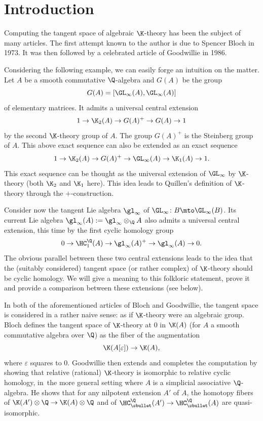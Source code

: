 \section*{Introduction}

Computing the tangent space of algebraic $\K$-theory has been the subject of many articles. The first attempt known to the author is due to Spencer Bloch \cite{bloch:tangentk} in 1973. It was then followed by a celebrated article of Goodwillie \cite{goodwillie:tangentk} in 1986.

Considering the following example, we can easily forge an intuition on the matter. Let $A$ be a smooth commutative $\Q$-algebra and $G(A)$ be the group
\[
G(A) = [\GL_\infty(A),\GL_\infty(A)]
\]
of elementary matrices. It admits a universal central extension
\[
1 \to \K_2(A) \to G(A)^+ \to G(A) \to 1
\]
by the second $\K$-theory group of $A$. The group $G(A)^+$ is the Steinberg group of $A$. This above exact sequence can also be extended as an exact sequence
\begin{equation}\label{eq:steinberg}
1 \to \K_2(A) \to G(A)^+ \to \GL_\infty(A) \to \K_1(A) \to 1.
\end{equation}
This exact sequence can be thought as the universal extension of $\GL_\infty$ by $\K$-theory (both $\K_2$ and $\K_1$ here). This idea leads to Quillen's definition of $\K$-theory through the $+$-construction.

Consider now the tangent Lie algebra $\gl_\infty$ of $\GL_\infty \colon B \mto \GL_\infty(B)$. Its current Lie algebra $\gl_\infty(A) := \gl_\infty \otimes_\Q A$ also admits a universal central extension, this time by the first cyclic homology group
\begin{equation} \label{eq:LQTextension}
0 \to \HC_1^\Q(A) \to \gl_\infty(A)^+ \to \gl_\infty(A) \to 0.
\end{equation}
The obvious parallel between these two central extensions leads to the idea that the (suitably considered) tangent space (or rather complex) of $\K$-theory should be cyclic homology. We will give a meaning to this folkloric statement, prove it and provide a comparison between these extensions (see below).

In both of the aforementioned articles of Bloch and Goodwillie, the tangent space is considered in a rather naive sense: as if $\K$-theory were an algebraic group. Bloch defines the tangent space of $\K$-theory at $0$ in $\K(A)$ (for $A$ a smooth commutative algebra over $\Q$) as the fiber of the augmentation
\[
\K(A[\varepsilon]) \to \K(A),
\]
where $\varepsilon$ squares to $0$. Goodwillie then extends and completes the computation by showing that relative (rational) $\K$-theory is isomorphic to relative cyclic homology, in~the more general setting where $A$ is a simplicial associative $\Q$-algebra. He shows that for any nilpotent extension $A'$ of $A$, the homotopy fibers of $\K(A') \otimes \Q \to \K(A) \otimes \Q$ and of $\HC^\Q_\sbullet(A') \to \HC^\Q_\sbullet(A)$ are quasi-isomorphic.

